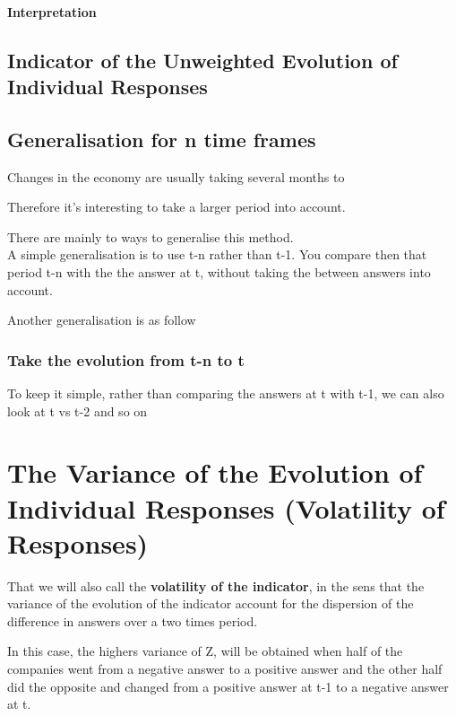 \documentclass[12pt,a4paper,oneside]{book}
\begin{document}
\subsubsection{Interpretation}


\section{Indicator of the Unweighted Evolution of Individual Responses}

\section{Generalisation for n time frames}

Changes in the economy are usually taking several months to 

Therefore it's interesting to take a larger period into account.

There are mainly to ways to generalise this method. \\ A simple generalisation is to use t-n rather than t-1. You compare then that period t-n with the the answer at t, without taking the between answers into account.

Another generalisation is as follow


\subsection{Take the evolution from t-n to t}

To keep it simple, rather than comparing the answers at t with t-1, we can also look at t vs t-2 and so on







\chapter{The Variance of the Evolution of Individual Responses (Volatility of Responses)} \label{Chapter:Z}

That we will also call the \textbf{volatility of the indicator}, in the sens that the variance of the evolution of the indicator account for the dispersion of the difference in answers over a two times period.

In this case, the highers variance of Z, will be obtained when half of the companies went from a negative answer to a positive answer and the other half did the opposite and changed from a positive answer at t-1 to a negative answer at t. 
\end{document}
